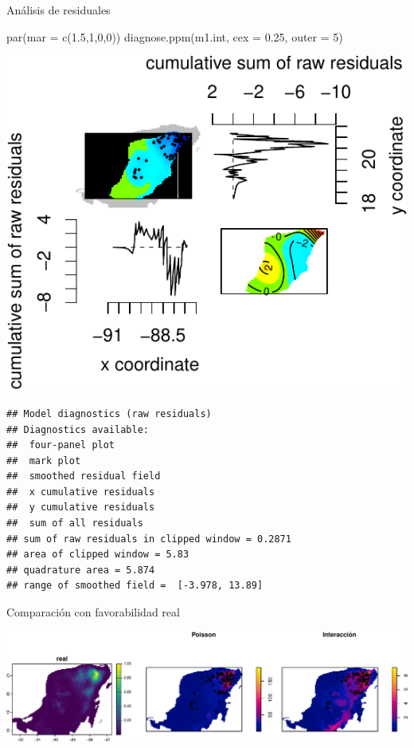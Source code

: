 \documentclass[
  11pt,
  ignorenonframetext,
]{beamer}
\newenvironment{Shaded}{}{}
\newcommand{\AttributeTok}[1]{\textcolor[rgb]{0.49,0.56,0.16}{#1}}
\newcommand{\DecValTok}[1]{\textcolor[rgb]{0.25,0.63,0.44}{#1}}
\newcommand{\FloatTok}[1]{\textcolor[rgb]{0.25,0.63,0.44}{#1}}
\newcommand{\FunctionTok}[1]{\textcolor[rgb]{0.02,0.16,0.49}{#1}}
\newcommand{\NormalTok}[1]{#1}
\begin{document}
\begin{frame}[fragile]{Análisis de residuales}
\protect\hypertarget{anuxe1lisis-de-residuales-1}{}
\begin{Shaded}
\begin{Highlighting}[]
\FunctionTok{par}\NormalTok{(}\AttributeTok{mar =} \FunctionTok{c}\NormalTok{(}\FloatTok{1.5}\NormalTok{,}\DecValTok{1}\NormalTok{,}\DecValTok{0}\NormalTok{,}\DecValTok{0}\NormalTok{))}
\FunctionTok{diagnose.ppm}\NormalTok{(m1.int, }\AttributeTok{cex =} \FloatTok{0.25}\NormalTok{, }\AttributeTok{outer =} \DecValTok{5}\NormalTok{)}
\end{Highlighting}
\end{Shaded}

\begin{center}\includegraphics{Tutorial-spatstat-2_files/figure-beamer/unnamed-chunk-37-1} \end{center}

\begin{verbatim}
## Model diagnostics (raw residuals)
## Diagnostics available:
##  four-panel plot
##  mark plot 
##  smoothed residual field
##  x cumulative residuals
##  y cumulative residuals
##  sum of all residuals
## sum of raw residuals in clipped window = 0.2871
## area of clipped window = 5.83
## quadrature area = 5.874
## range of smoothed field =  [-3.978, 13.89]
\end{verbatim}
\end{frame}

\begin{frame}{Comparación con favorabilidad real}
\protect\hypertarget{comparaciuxf3n-con-favorabilidad-real}{}
\begin{center}\includegraphics{Tutorial-spatstat-2_files/figure-beamer/unnamed-chunk-38-1} \end{center}
\end{frame}
\end{document}
